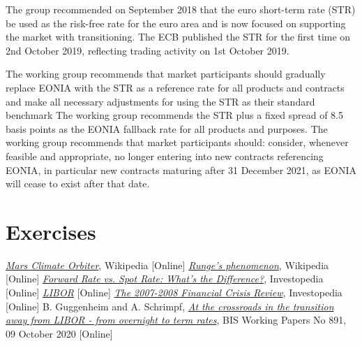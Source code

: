 The group recommended on September 2018 that the euro short-term rate (STR) be used as the risk-free rate for the euro area and is now focused on supporting the market with transitioning.
The ECB published the STR for the first time on 2nd October 2019, reflecting trading activity on 1st October 2019.

The working group recommends that market participants should gradually replace EONIA with the STR as a reference rate for all products and contracts and make all necessary adjustments for using the STR as their standard benchmark The working group recommends the STR plus a fixed spread of 8.5
basis points as the EONIA fallback rate for all products and purposes. The working group recommends that market participants should: consider, whenever feasible and appropriate, no longer entering into new contracts referencing EONIA, in particular new contracts maturing after 31 December 2021, as EONIA will cease to exist after that date.


\section*{Exercises}


\begin{thebibliography}{9}
	\href{https://en.wikipedia.org/wiki/Mars_Climate_Orbiter}{\emph{Mars Climate Orbiter}}, Wikipedia [Online]
	 \href{https://en.wikipedia.org/wiki/Runge\%27s_phenomenon}{\emph{Runge's phenomenon}}, Wikipedia [Online]
	\href{https://www.investopedia.com/ask/answers/042315/what-difference-between-forward-rate-and-spot-rate.asp}{\emph{Forward Rate vs. Spot Rate: What's the Difference?}}, Investopedia [Online]
	 \href{https://www.ig.com/it/glossario-trading/definizione-di-libor}{\emph{LIBOR}} [Online]
	 \href{https://www.investopedia.com/articles/economics/09/financial-crisis-review.asp}{\emph{The 2007-2008 Financial Crisis Review}}, Investopedia [Online]
	B. Guggenheim and A. Schrimpf, 
	\href{https://www.bis.org/publ/work891.htm}{\emph{At the crossroads in the transition away from LIBOR - from overnight to term rates}}, BIS Working Papers No 891, 09 October 2020 [Online]
\end{thebibliography}
